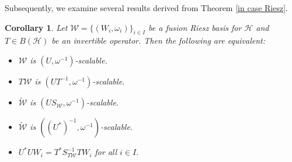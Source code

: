 \documentclass[sn-mathphys-num]{sn-jnl}%
\newtheorem{corollary}[theorem]{Corollary}
\theoremstyle{definition}
\theoremstyle{remark}
\numberwithin{equation}{section}
\begin{document}
Subsequently, we examine several results derived from Theorem \ref{in case Riesz}.

\begin{corollary}\label{Riesz other}
Let $\mathcal{W}=\{(W_{i},\omega_{i})\}_{i \in I} $ be a fusion Riesz basis for $\mathcal {H}$ and $T\in B(\mathcal{H})$ be an invertible operator. Then the following are equivalent:
\begin{itemize}
\item[$(i)$] $\mathcal{W}$ is $\left( U,\omega^{-1}\right) $-scalable.
\item[$(ii)$] $T\mathcal{W}$ is $\left( UT^{-1},\omega^{-1}\right) $-scalable.
\item[$(iii)$] $\widetilde{\mathcal{W}}$ is $\left( US_{\mathcal{W}},\omega^{-1}\right) $-scalable.
\item[$(iv)$] $\widetilde{\mathcal{W}}$ is $\left( \left( U^{*}\right) ^{-1},\omega^{-1}\right) $-scalable.
\item[$(v)$] $U^*UW_{i}=T^{*}S_{T\mathcal{W}}^{-1}TW_{i}$ for all $ i \in I.$   
\end{itemize}
\end{corollary}
\end{document}
